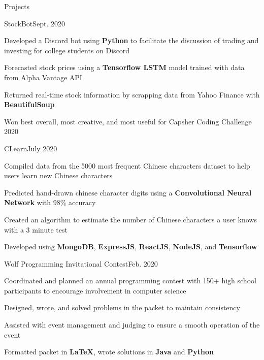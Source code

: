 \documentclass{resume} %
\begin{document}

\begin{rSection}{Projects}

\begin{rSubsection}{StockBot}{Sept. 2020}{}{}
    \item Developed a Discord bot using \textbf{Python} to facilitate the discussion of trading and investing for college students on Discord
    \item Forecasted stock prices using a \textbf{Tensorflow LSTM} model trained with data from Alpha Vantage API
    \item Returned real-time stock information by scrapping data from Yahoo Finance with \textbf{BeautifulSoup}
    \item Won best overall, most creative, and most useful for Capsher Coding Challenge 2020
\end{rSubsection}

\begin{rSubsection}{CLearn}{July 2020}{}{}
    \item Compiled data from the 5000 most frequent Chinese characters dataset to help users learn new Chinese characters
    \item Predicted hand-drawn chinese character digits using a \textbf{Convolutional Neural Network} with 98\% accuracy
    \item Created an algorithm to estimate the number of Chinese characters a user knows with a 3 minute test
    \item Developed using \textbf{MongoDB}, \textbf{ExpressJS}, \textbf{ReactJS}, \textbf{NodeJS}, and \textbf{Tensorflow}
\end{rSubsection}

\begin{rSubsection}{Wolf Programming Invitational Contest}{Feb. 2020}{}{}
    \item Coordinated and planned an annual programming contest with 150+ high school participants to encourage involvement in computer science
    \item Designed, wrote, and solved problems in the packet to maintain consistency
    \item Assisted with event management and judging to ensure a smooth operation of the event
    \item Formatted packet in \textbf{LaTeX}, wrote solutions in \textbf{Java} and \textbf{Python}
\end{rSubsection}
\end{rSection}
\end{document}
